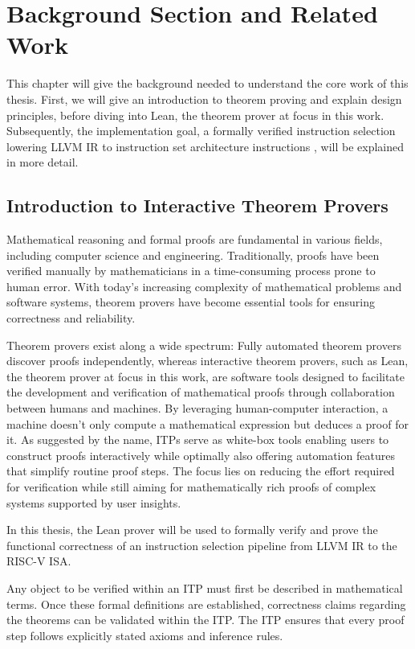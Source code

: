 \chapter{Background Section and Related Work}

This chapter will give the background needed to understand the core work of this thesis. First, we will give an introduction to theorem proving and explain design principles,  before diving into Lean, the theorem prover at focus in this work. Subsequently, the implementation goal, a formally verified instruction selection lowering LLVM IR to instruction set architecture instructions , will be explained in more detail.

\section{Introduction to Interactive Theorem Provers}
Mathematical reasoning and formal proofs are fundamental in various fields, including computer science and engineering. Traditionally, proofs have been verified manually by mathematicians in a time-consuming process prone to human error. With today's increasing complexity of mathematical problems and software systems, theorem provers have become essential tools for ensuring correctness and reliability. 

Theorem provers exist along a wide spectrum: Fully automated theorem provers discover proofs independently, whereas interactive theorem provers, such as Lean, the theorem prover at focus in this work, are software tools designed to facilitate the development and verification of mathematical proofs through collaboration between humans and machines. By leveraging human-computer interaction, a machine doesn’t only compute a mathematical expression but deduces a proof for it. As suggested by the name, ITPs serve as white-box tools enabling users to construct proofs interactively while optimally also offering automation features that simplify routine proof steps. The focus lies on reducing the effort required for verification while still aiming for mathematically rich proofs of complex systems supported by user insights. 

 In this thesis, the Lean prover will be used to formally verify and prove the functional correctness of an instruction selection pipeline from LLVM IR to the RISC-V ISA.

Any object to be verified within an ITP must first be described in mathematical terms. Once these formal definitions are established, correctness claims regarding the theorems can be validated within the ITP. The ITP ensures that every proof step follows explicitly stated axioms and inference rules.  

